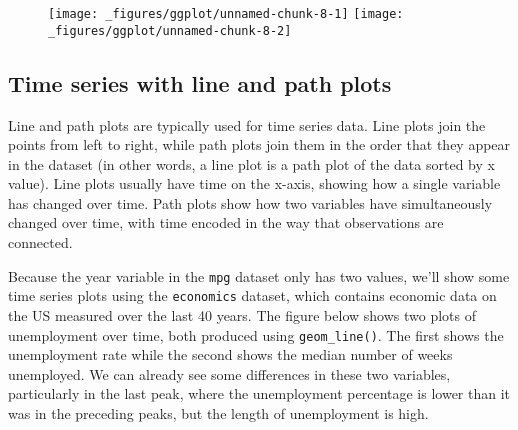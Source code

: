 \begin{Shaded}
\begin{Highlighting}[]
\StringTok{ }\NormalTok{(} \NormalTok{)}
\StringTok{ }\NormalTok{()}
\end{Highlighting}
\end{Shaded}

\begin{figure}[H]
  \texttt{[image: \_figures/ggplot/unnamed-chunk-8-1]}%
  \texttt{[image: \_figures/ggplot/unnamed-chunk-8-2]}
\end{figure}

\subsection{Time series with line and path plots}\label{sub:line}

Line and path plots are typically used for time series data. Line plots
join the points from left to right, while path plots join them in the
order that they appear in the dataset (in other words, a line plot is a
path plot of the data sorted by x value). Line plots usually have time
on the x-axis, showing how a single variable has changed over time. Path
plots show how two variables have simultaneously changed over time, with
time encoded in the way that observations are connected.

Because the year variable in the \texttt{mpg} dataset only has two
values, we'll show some time series plots using the \texttt{economics}
dataset, which contains economic data on the US measured over the last
40 years. The figure below shows two plots of unemployment over time,
both produced using \texttt{geom\_line()}. The first shows the
unemployment rate while the second shows the median number of weeks
unemployed. We can already see some differences in these two variables,
particularly in the last peak, where the unemployment percentage is
lower than it was in the preceding peaks, but the length of unemployment
is high.  

\begin{Shaded}
\begin{Highlighting}[]
\StringTok{ }
\StringTok{  }\NormalTok{()}
\StringTok{  }\NormalTok{()}
\end{Highlighting}
\end{Shaded}

